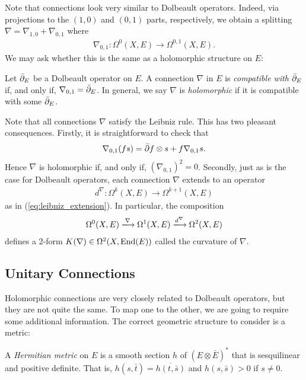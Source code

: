 \documentclass[12pt]{ociamthesis}  %
\begin{document}
Note that connections look very similar to Dolbeault operators.
Indeed, via projections to the $(1,0)$ and $(0,1)$ parts, respectively,
we obtain a splitting $\nabla = \nabla_{1,0} + \nabla_{0,1}$
where
\begin{align*}
  \nabla_{0,1} : \Omega^0(X,E) \to \Omega^{0,1}(X,E).
\end{align*}
We may ask whether this is the same as a holomorphic structure on $E$:

\begin{definition}
  Let ${\bar{\partial}}_E$ be a Dolbeault operator on $E$.
  A connection $\nabla$ in $E$ is \emph{compatible with ${\bar{\partial}}_E$}
  if, and only if, $\nabla_{0,1} = {\bar{\partial}}_E$. In general, we say
  $\nabla$ is \emph{holomorphic} if it is compatible with some
  ${\bar{\partial}}_E$.
\end{definition}

Note that all connections $\nabla$ satisfy the Leibniz rule. This has
two pleasant consequences. Firstly, it is straightforward to check that
\begin{align*}
  \nabla_{0,1} (fs) = {\bar{\partial}} f\otimes s + f \nabla_{0,1} s.
\end{align*}
Hence $\nabla$ is holomorphic if, and only if, $(\nabla_{0,1})^2 = 0$.
Secondly, just as is the case for Dolbeault operators, each connection
$\nabla$ extends to an operator
\begin{align*}
  d^\nabla : \Omega^k(X,E) \longrightarrow \Omega^{k+1}(X,E)
\end{align*}
as in (\ref{eq:leibniz_extension}). In particular, the
composition
\begin{align*}
  \Omega^0(X,E) \xlongrightarrow{\nabla}
  \Omega^1(X,E) \xlongrightarrow{d^\nabla}
  \Omega^{2}(X,E)
\end{align*}
defines a 2-form $K(\nabla)\in\Omega^2(X,\operatorname{End}(E))$ called
the curvature of $\nabla$.

\subsection{Unitary Connections}

Holomorphic connections are very closely related to Dolbeault operators,
but they are not quite the same. To map one to the other, we are going
to require some additional information. The correct geometric
structure to consider is a metric:

\begin{definition}
  A \emph{Hermitian metric} on $E$ is a smooth section $h$ of
  $(E\otimes\bar E)^*$ that is sesquilinear and positive definite.
  That is, $h(s,\bar t) = \overline{h(t,\bar s)}$ and $h(s,\bar s) > 0$
  if $s \neq 0$.
\end{definition}
\end{document}
